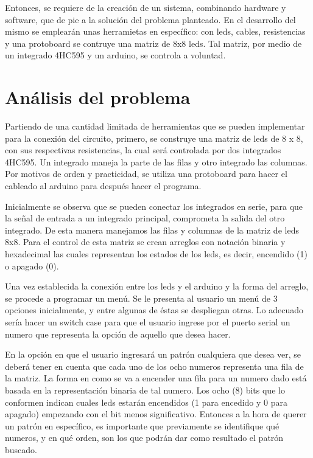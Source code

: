 \documentclass{article}
\begin{document}
Entonces, se requiere de la creación de un sistema, combinando hardware y software, que de pie a la solución del problema planteado. En el desarrollo del mismo se emplearán unas herramietas en específico: con leds, cables, resistencias y una protoboard se contruye una matriz de 8x8 leds. 
Tal matriz, por medio de un integrado 4HC595 y un arduino, se controla a voluntad. 

\section{Análisis del problema} \label{contenido}
Partiendo de una cantidad limitada de herramientas que se pueden implementar para la conexión del circuito, primero, se construye una matriz de leds de 8 x 8, con sus respectivas resistencias, la cual será controlada por dos integrados 4HC595. Un integrado maneja la parte de las filas y otro integrado las columnas. Por motivos de orden y practicidad, se utiliza una protoboard para hacer el cableado al arduino para después hacer el programa.
\newline

Inicialmente se observa que se pueden conectar los integrados en serie, para que la señal de entrada a un integrado principal, comprometa la salida del otro integrado. De esta manera manejamos las filas y columnas de la matriz de leds 8x8.
Para el control de esta matriz se crean arreglos con notación binaria y hexadecimal las cuales representan los estados de los leds, es decir, encendido (1) o apagado (0).
\newline

Una vez establecida la conexión entre los leds y el arduino y la forma del arreglo, se procede a programar un menú.
Se le presenta al usuario un menú de 3 opciones inicialmente, y entre algunas de éstas se despliegan otras. Lo adecuado sería hacer un switch case para que el usuario ingrese por el puerto serial un numero que representa la opción de aquello que desea hacer. 
\newline

En la opción en que el usuario ingresará un patrón cualquiera que desea ver, se deberá tener en cuenta que cada uno de los ocho numeros representa una fila de la matriz. La forma en como se va a encender una fila para un numero dado está basada en la representación binaria de tal numero. Los ocho (8) bits que lo conformen indican cuales leds estarán encendidos (1 para encedido y 0 para apagado) empezando con el bit menos significativo. 
Entonces a la hora de querer un patrón en específico, es importante que previamente se identifique qué numeros, y en qué orden, son los que podrán dar como resultado el patrón buscado. 
\end{document}
